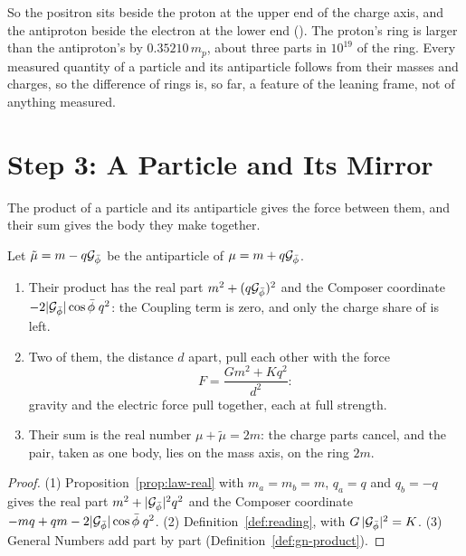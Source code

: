 So the positron sits beside the proton at the upper end of the charge axis, and the antiproton beside the electron at the lower end (). The proton's ring is larger than the antiproton's by $0.35210\,m_p$, about three parts in $10^{19}$ of the ring. Every measured quantity of a particle and its antiparticle follows from their masses and charges, so the difference of rings is, so far, a feature of the leaning frame, not of anything measured.

\section{Step 3: A Particle and Its Mirror}\label{sec:fa-pair}

The product of a particle and its antiparticle gives the force between them, and their sum gives the body they make together.

\begin{proposition}\label{prop:fa-pair}
Let $\tilde{\mu} = m - q\mathcal{G}_{\bar{\phi}}$ be the antiparticle of $\mu = m + q\mathcal{G}_{\bar{\phi}}$.
\begin{enumerate}
  \item Their product has the real part $m^2 + (q\mathcal{G}_{\bar{\phi}})^2$ and the Composer coordinate $-2|\mathcal{G}_{\bar{\phi}}|\cos\bar{\phi}\;q^2$: the Coupling term is zero, and only the charge share of  is left.
  \item Two of them, the distance $d$ apart, pull each other with the force
  \[
  F = \frac{G m^2 + K q^2}{d^2} :
  \]
  gravity and the electric force pull together, each at full strength.
  \item Their sum is the real number $\mu + \tilde{\mu} = 2m$: the charge parts cancel, and the pair, taken as one body, lies on the mass axis, on the ring $2m$.
\end{enumerate}
\end{proposition}

\begin{proof}
(1) Proposition~\ref{prop:law-real} with $m_a = m_b = m$, $q_a = q$ and $q_b = -q$ gives the real part $m^2 + |\mathcal{G}_{\bar{\phi}}|^2 q^2$ and the Composer coordinate $-mq + qm - 2|\mathcal{G}_{\bar{\phi}}|\cos\bar{\phi}\;q^2$. (2) Definition~\ref{def:reading}, with $G\,|\mathcal{G}_{\bar{\phi}}|^2 = K$. (3) General Numbers add part by part (Definition~\ref{def:gn-product}).
\end{proof}


